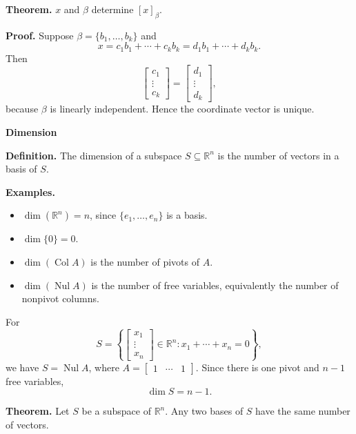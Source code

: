 \documentclass{article}
\begin{document}
\textbf{Theorem.} $x$ and $\beta$ determine $[x]_\beta$.

\medskip

\textbf{Proof.} Suppose $\beta=\{b_1,\ldots,b_k\}$ and
\[
x=c_1b_1+\cdots+c_kb_k=d_1b_1+\cdots+d_kb_k.
\]
Then
\[
\begin{bmatrix}c_1\\ \vdots\\ c_k\end{bmatrix}
=
\begin{bmatrix}d_1\\ \vdots\\ d_k\end{bmatrix},
\]
because $\beta$ is linearly independent. Hence the coordinate vector is unique.

\bigskip

\textbf{Dimension}

\medskip

\textbf{Definition.} The dimension of a subspace $S\subseteq\mathbb{R}^n$ is the number of vectors in a basis of $S$.

\medskip

\textbf{Examples.}
\begin{itemize}
\item $\dim(\mathbb{R}^n)=n$, since $\{e_1,\ldots,e_n\}$ is a basis.
\item $\dim\{0\}=0$.
\item $\dim(\operatorname{Col} A)$ is the number of pivots of $A$.
\item $\dim(\operatorname{Nul} A)$ is the number of free variables, equivalently the number of nonpivot columns.
\end{itemize}

\medskip

For
\[
S=\left\{\begin{bmatrix}x_1\\ \vdots\\x_n\end{bmatrix}\in\mathbb{R}^n:x_1+\cdots+x_n=0\right\},
\]
we have $S=\operatorname{Nul} A$, where $A=\begin{bmatrix}1&\cdots&1\end{bmatrix}$. Since there is one pivot and $n-1$ free variables,
\[
\dim S=n-1.
\]

\newpage

\textbf{Theorem.} Let $S$ be a subspace of $\mathbb{R}^n$. Any two bases of $S$ have the same number of vectors.

\medskip
\end{document}
